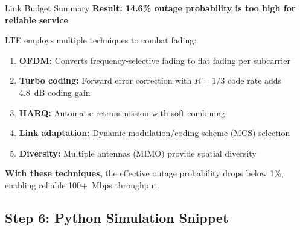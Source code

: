 \begin{calloutbox}[colback=black!8!white,colframe=black]{Link Budget Summary}
\textbf{Result: 14.6\% outage probability is too high for reliable service}

LTE employs multiple techniques to combat fading:
\begin{enumerate}
\item \textbf{OFDM:} Converts frequency-selective fading to flat fading per subcarrier
\item \textbf{Turbo coding:} Forward error correction with $R = 1/3$ code rate adds 4.8~dB coding gain
\item \textbf{HARQ:} Automatic retransmission with soft combining
\item \textbf{Link adaptation:} Dynamic modulation/coding scheme (MCS) selection
\item \textbf{Diversity:} Multiple antennas (MIMO) provide spatial diversity
\end{enumerate}

\textbf{With these techniques,} the effective outage probability drops below 1\%, enabling reliable 100+~Mbps throughput.
\end{calloutbox}

\subsection*{Step 6: Python Simulation Snippet}

